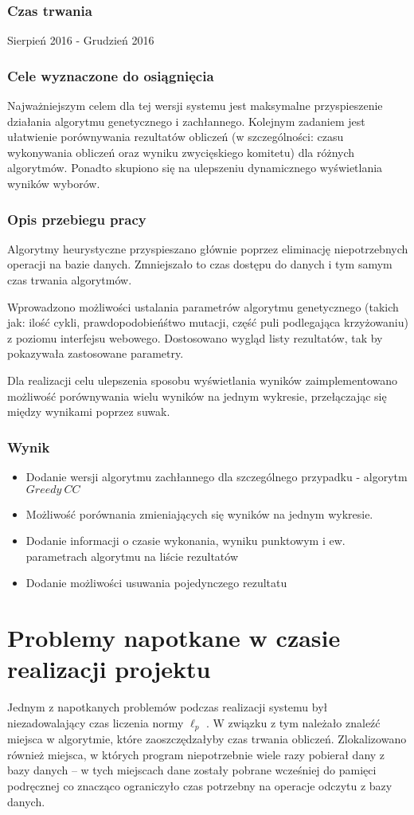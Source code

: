 \documentclass[pdflatex,11pt]{../aghdoc_version2}
\begin{document}
\subsubsection{Czas trwania}
Sierpień 2016 - Grudzień 2016
\subsubsection{Cele wyznaczone do osiągnięcia}
Najważniejszym celem dla tej wersji systemu jest maksymalne przyspieszenie działania
algorytmu genetycznego i zachłannego.
Kolejnym zadaniem jest ułatwienie porównywania rezultatów obliczeń (w szczególności:
czasu wykonywania obliczeń oraz wyniku zwycięskiego komitetu) dla różnych algorytmów.
Ponadto skupiono się na ulepszeniu dynamicznego wyświetlania wyników wyborów.
\subsubsection{Opis przebiegu pracy}
Algorytmy heurystyczne przyspieszano głównie poprzez eliminację niepotrzebnych operacji
na bazie danych. Zmniejszało to czas dostępu do danych i tym samym czas trwania
algorytmów. 

Wprowadzono możliwości ustalania parametrów algorytmu genetycznego (takich jak: ilość cykli, prawdopodobieńśtwo
mutacji, część puli podlegająca krzyżowaniu) z poziomu interfejsu webowego.
Dostosowano wygląd listy rezultatów, tak by pokazywała zastosowane parametry.

Dla realizacji celu ulepszenia sposobu wyświetlania wyników zaimplementowano możliwość porównywania 
wielu wyników na jednym wykresie, przełączając się między wynikami poprzez suwak. 

\subsubsection{Wynik}
\begin{itemize}
\item Dodanie wersji algorytmu zachłannego dla szczególnego przypadku - algorytm $Greedy \ CC$
\item Możliwość porównania zmieniających się wyników na jednym wykresie.
\item Dodanie informacji o czasie wykonania, wyniku punktowym i ew. parametrach algorytmu na liście rezultatów
\item Dodanie możliwości usuwania pojedynczego rezultatu
\end{itemize}

\section{Problemy napotkane w czasie realizacji projektu}
Jednym z napotkanych problemów podczas realizacji systemu był niezadowalający czas
liczenia normy $\ell_p$ . W związku z tym należało znaleźć miejsca w algorytmie, które
zaoszczędzałyby czas trwania obliczeń. Zlokalizowano również miejsca, w których program
niepotrzebnie wiele razy pobierał dany z bazy danych – w tych miejscach dane zostały pobrane wcześniej do pamięci podręcznej co znacząco ograniczyło czas potrzebny na operacje odczytu z bazy danych.
% 
% 
\end{document}
